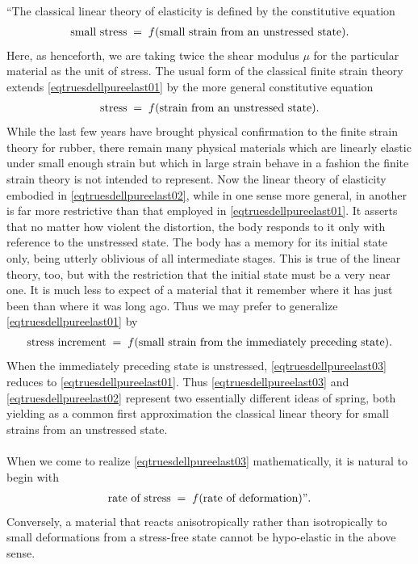 \documentclass[10pt]{article}
\numberwithin{theoremCounter}{section}
\theoremstyle{plain}
\theoremstyle{definition}
\numberwithin{equation}{section}
\begin{document}
\begin{appendix}
\\
``The classical linear theory of elasticity is defined by the constitutive equation
	\begin{align}
	\label{eqtruesdellpureelast01}
	\textnormal{small stress} \; = \; f \textnormal{(small strain from an unstressed state)}.
	\end{align}
Here, as henceforth, we are taking twice the shear modulus $\mu$ for the particular material as the unit of stress. The usual form of the classical finite strain theory extends \eqref{eqtruesdellpureelast01} by the more general constitutive equation
	\begin{align}
	\label{eqtruesdellpureelast02}
	\textnormal{stress} \; = \; f \textnormal{(strain from an unstressed state).}
	\end{align}
While the last few years have brought physical confirmation to the finite strain theory for rubber, there remain many physical materials which are linearly elastic under small enough strain but which in large strain behave in a fashion the finite strain theory is not intended to represent. Now the linear theory of elasticity embodied in \eqref{eqtruesdellpureelast02}, while in one sense more general, in another is far more restrictive than that employed in \eqref{eqtruesdellpureelast01}. It asserts that no matter how violent the distortion, the body responds to it only with reference to the unstressed state. The body has a memory for its initial state only, being utterly oblivious of all intermediate stages. This is true of the linear theory, too, but with the restriction that the initial state must be a very near one. It is much less to expect of a material that it remember where it has just been than where it was long ago. Thus we may prefer to generalize \eqref{eqtruesdellpureelast01} by
	\begin{align}
	\label{eqtruesdellpureelast03}
	\textnormal{stress increment} \; = \; f \textnormal{(small strain from the immediately preceding state).}
	\end{align}
When the immediately preceding state is unstressed, \eqref{eqtruesdellpureelast03} reduces to \eqref{eqtruesdellpureelast01}. Thus \eqref{eqtruesdellpureelast03} and \eqref{eqtruesdellpureelast02} represent two essentially different ideas of spring, both yielding as a common first approximation the classical linear theory for small strains \cite{Marsden83} from an unstressed state. \\
\\
When we come to realize \eqref{eqtruesdellpureelast03} mathematically, it is natural to begin with
	\begin{align}
	\textnormal{rate of stress} \; = \; f \textnormal{(rate of deformation)''}.
	\end{align}
%
Conversely, a material that reacts anisotropically rather than isotropically to small deformations from a stress-free state cannot be hypo-elastic in the above sense.
%

\end{appendix}
\end{document}
